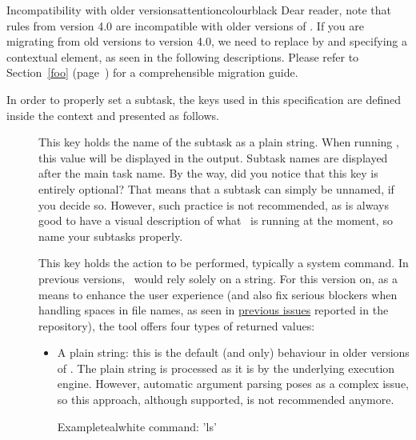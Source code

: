 \begin{description}
\begin{messagebox}{Incompatibility with older versions}{attentioncolour}{\icerror}{black}
Dear reader, note that rules from version 4.0 are incompatible with older versions of \arara. If you are migrating from old versions to version 4.0, we need to replace  by  and specifying a contextual element, as seen in the following descriptions. Please refer to Section~\ref{foo} (page~\pageref{foo}) for a comprehensible migration guide.
\end{messagebox}

In order to properly set a subtask, the keys used in this specification are defined inside the  context and presented as follows.

\begin{description}
\item[] This key holds the name of the subtask as a plain string. When running \arara, this value will be displayed in the output. Subtask names are displayed after the main task name. By the way, did you notice that this key is entirely optional? That means that a subtask can simply be unnamed, if you decide so. However, such practice is not recommended, as is always good to have a visual description of what \arara\ is running at the moment, so name your subtasks properly.

\item[] This key holds the action to be performed, typically a system command. In previous versions, \arara\ would rely solely on a string. For this version on, as a means to enhance the user experience (and also fix serious blockers when handling spaces in file names, as seen in \href{https://github.com/cereda/arara/issues}{previous issues} reported in the repository), the tool offers four types of returned values:

\begin{itemize}[label={--}]
\item A plain string: this is the default (and only) behaviour in older versions of \arara. The plain string is processed as it is by the underlying execution engine. However, automatic argument parsing poses as a complex issue, so this approach, although supported, is not recommended anymore.

\begin{codebox}{Example}{teal}{\icnote}{white}
command: 'ls'
\end{codebox}


\end{itemize}
\end{description}
\end{description}
